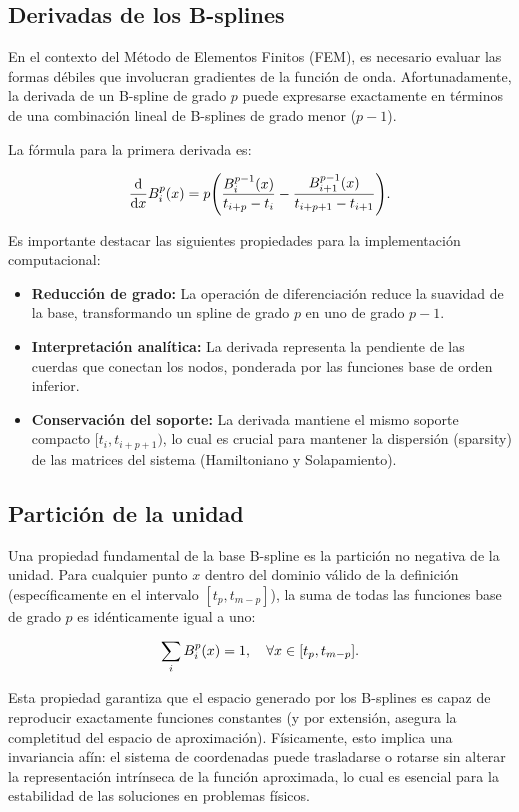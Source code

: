 \documentclass[12pt, a4paper, oneside, spanish]{book}
\begin{document}
\subsection{Derivadas de los B-splines}

En el contexto del Método de Elementos Finitos (FEM), es necesario evaluar las formas débiles que involucran gradientes de la función de onda. Afortunadamente, la derivada de un B-spline de grado \( p \) puede expresarse exactamente en términos de una combinación lineal de B-splines de grado menor (\( p-1 \)).

La fórmula para la primera derivada es:

\[ \dv{x} B_i^p(x) = p \qty( \frac{B_i^{p-1}(x)}{t_{i+p}-t_i} - \frac{B_{i+1}^{p-1}(x)}{t_{i+p+1}-t_{i+1}} ). \]

Es importante destacar las siguientes propiedades para la implementación computacional:
\begin{itemize}
\item \textbf{Reducción de grado:} La operación de diferenciación reduce la suavidad de la base, transformando un spline de grado \( p \) en uno de grado \( p-1 \).
\item \textbf{Interpretación analítica:} La derivada representa la pendiente de las cuerdas que conectan los nodos, ponderada por las funciones base de orden inferior.
\item \textbf{Conservación del soporte:} La derivada mantiene el mismo soporte compacto \( [t_i, t_{i+p+1}) \), lo cual es crucial para mantener la dispersión (sparsity) de las matrices del sistema (Hamiltoniano y Solapamiento).
\end{itemize}

\subsection{Partición de la unidad}

Una propiedad fundamental de la base B-spline es la partición no negativa de la unidad. Para cualquier punto \( x \) dentro del dominio válido de la definición (específicamente en el intervalo \( [t_p,t_{m-p}] \)), la suma de todas las funciones base de grado \( p \) es idénticamente igual a uno:

\begin{equation}
  \label{eq:part-unity}
  \sum_{i}B_i^p(x) = 1 \qc \forall x \in [t_p, t_{m-p}].
\end{equation}

Esta propiedad garantiza que el espacio generado por los B-splines es capaz de reproducir exactamente funciones constantes (y por extensión, asegura la completitud del espacio de aproximación). Físicamente, esto implica una invariancia afín: el sistema de coordenadas puede trasladarse o rotarse sin alterar la representación intrínseca de la función aproximada, lo cual es esencial para la estabilidad de las soluciones en problemas físicos.
\end{document}

